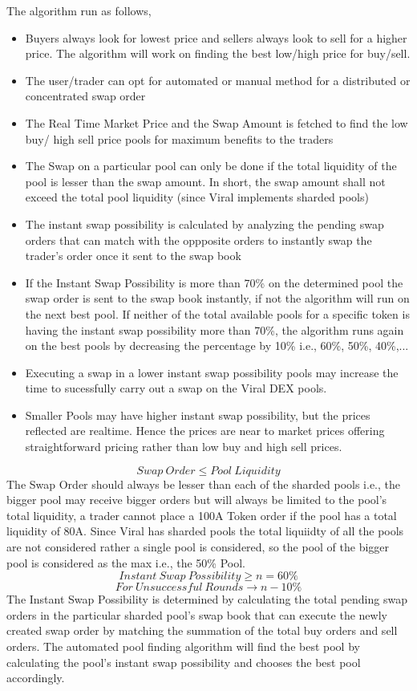 \documentclass[conference]{IEEEtran}
\begin{document}
The algorithm run as follows,
\begin{itemize}[wide, labelwidth=!, labelindent=0pt]
\item Buyers always look for lowest price and sellers always look to sell for a higher price. The algorithm will work on finding the best low/high price for buy/sell.
\item The user/trader can opt for automated or manual method for a distributed or concentrated swap order
\item The Real Time Market Price and the Swap Amount is fetched to find the low buy/ high sell price pools for maximum benefits to the traders
\item The Swap on a particular pool can only be done if the total liquidity of the pool is lesser than the swap amount. In short, the swap amount shall not exceed the total pool liquidity (since Viral implements sharded pools)
\item The instant swap possibility is calculated by analyzing the pending swap orders that can match with the oppposite orders to instantly swap the trader's order once it sent to the swap book
\item If the Instant Swap Possibility is more than 70\% on the determined pool the swap order is sent to the swap book instantly, if not the algorithm will run on the next best pool. If neither of the total available pools for a specific token is having the instant swap possibility more than 70\%, the algorithm runs again on the best pools by decreasing the percentage by 10\% i.e., 60\%, 50\%, 40\%,...
\item Executing a swap in a lower instant swap possibility pools may increase the time to sucessfully carry out a swap on the Viral DEX pools.
\item Smaller Pools may have higher instant swap possibility, but the prices reflected are realtime. Hence the prices are near to market prices offering straightforward pricing rather than low buy and high sell prices.
\end{itemize}
\[Swap\:Order \leq Pool\:Liquidity \]
The Swap Order should always be lesser than each of the sharded pools i.e., the bigger pool may receive bigger orders but will always be limited to the pool's total liquidity, a trader cannot place a 100A Token order if the pool has a total liquidity of 80A. Since Viral has sharded pools the total liquiidty of all the pools are not considered rather a single pool is considered, so the pool of the bigger pool is considered as the max i.e., the 50\% Pool.\\
\[Instant\:Swap\:Possibility \geq n = 60\%\]
\[For\:Unsuccessful\:Rounds \rightarrow n-10\%\]
The Instant Swap Possibility is determined by calculating the total pending swap orders in the particular sharded pool's swap book that can execute the newly created swap order by matching the summation of the total buy orders and sell orders. The automated pool finding algorithm will find the best pool by calculating the pool's instant swap possibility and chooses the best pool accordingly.\\
\end{document}
